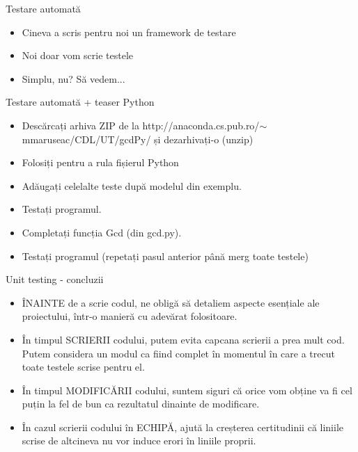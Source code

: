 \documentclass{beamer}
\begin{document}
\begin{frame}{Testare automată}
\begin{itemize}
\item Cineva a scris pentru noi un framework de testare
\item \pause Noi doar vom scrie testele
\item \pause Simplu, nu? \pause Să vedem...
\end{itemize}
\end{frame}

\begin{frame}{Testare automată + teaser Python}
\begin{itemize}
\item Descărcați arhiva ZIP de la http://anaconda.cs.pub.ro/$\sim$mmaruseac/CDL/UT/gcdPy/ și dezarhivați-o (unzip)
\item Folosiți \linebreak pentru a rula fișierul Python
\item \pause Adăugați celelalte teste după modelul din exemplu.
\item \pause Testați programul.
\item \pause Completați funcția Gcd (din gcd.py).
\item \pause Testați programul (repetați pasul anterior până merg toate testele)
\end{itemize}
\end{frame}

\begin{frame}{Unit testing - concluzii}
\begin{itemize}
\item ÎNAINTE de a scrie codul, ne obligă să detaliem aspecte esențiale ale proiectului, într-o manieră cu adevărat folositoare.
\item \pause În timpul SCRIERII codului, putem evita capcana scrierii a prea mult cod. \pause Putem considera un modul ca fiind complet în momentul în care a trecut toate testele scrise pentru el.
\item \pause În timpul MODIFICĂRII codului, suntem siguri că orice vom obține va fi cel puțin la fel de bun ca rezultatul dinainte de modificare.
\item \pause În cazul scrierii codului în ECHIPĂ, ajută la creșterea certitudinii că liniile scrise de altcineva nu vor induce erori în liniile proprii.
\end{itemize}
\end{frame}
\end{document}
